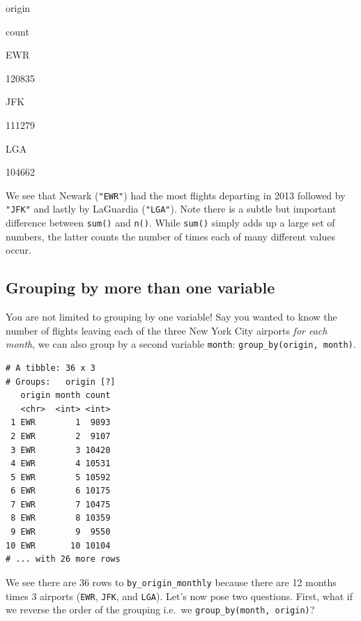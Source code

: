 \documentclass[12pt,]{krantz}
\makeatletter
\newenvironment{Shaded}{\begin{snugshade}}{\end{snugshade}}
\newcommand{\KeywordTok}[1]{\textcolor[rgb]{0.27,0.27,0.27}{\textbf{#1}}}
\newcommand{\DataTypeTok}[1]{\textcolor[rgb]{0.27,0.27,0.27}{#1}}
\newcommand{\StringTok}[1]{\textcolor[rgb]{0.5,0.5,0.5}{#1}}
\newcommand{\OperatorTok}[1]{\textcolor[rgb]{0.43,0.43,0.43}{\textbf{#1}}}
\newcommand{\NormalTok}[1]{#1}
\newenvironment{kframe}{%
\medskip{}
\setlength{\fboxsep}{.8em}
 \def\at@end@of@kframe{}%
 \ifinner\ifhmode%
  \def\at@end@of@kframe{\end{minipage}}%
  \begin{minipage}{\columnwidth}%
 \fi\fi%
 \def\FrameCommand##1{\hskip\@totalleftmargin \hskip-\fboxsep
 \colorbox{shadecolor}{##1}\hskip-\fboxsep
     \hskip-\linewidth \hskip-\@totalleftmargin \hskip\columnwidth}%
 \MakeFramed {\advance\hsize-\width
   \@totalleftmargin\z@ \linewidth\hsize
   \@setminipage}}%
 {\par\unskip\endMakeFramed%
 \at@end@of@kframe}
\renewenvironment{Shaded}{\begin{kframe}}{\end{kframe}}
\makeatother
\begin{document}
origin

count

EWR

120835

JFK

111279

LGA

104662

We see that Newark (\texttt{"EWR"}) had the most flights departing in
2013 followed by \texttt{"JFK"} and lastly by LaGuardia
(\texttt{"LGA"}). Note there is a subtle but important difference
between \texttt{sum()} and \texttt{n()}. While \texttt{sum()} simply
adds up a large set of numbers, the latter counts the number of times
each of many different values occur.

\subsection{Grouping by more than one
variable}\label{grouping-by-more-than-one-variable}

You are not limited to grouping by one variable! Say you wanted to know
the number of flights leaving each of the three New York City airports
\emph{for each month}, we can also group by a second variable
\texttt{month}: \texttt{group\_by(origin,\ month)}.

\begin{Shaded}
\end{Shaded}

\begin{verbatim}
# A tibble: 36 x 3
# Groups:   origin [?]
   origin month count
   <chr>  <int> <int>
 1 EWR        1  9893
 2 EWR        2  9107
 3 EWR        3 10420
 4 EWR        4 10531
 5 EWR        5 10592
 6 EWR        6 10175
 7 EWR        7 10475
 8 EWR        8 10359
 9 EWR        9  9550
10 EWR       10 10104
# ... with 26 more rows
\end{verbatim}

We see there are 36 rows to \texttt{by\_origin\_monthly} because there
are 12 months times 3 airports (\texttt{EWR}, \texttt{JFK}, and
\texttt{LGA}). Let's now pose two questions. First, what if we reverse
the order of the grouping i.e.~we \texttt{group\_by(month,\ origin)}?
\end{document}
